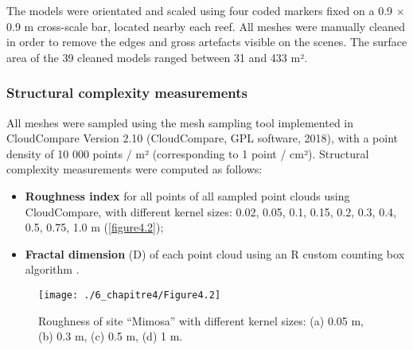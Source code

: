 The models were orientated and scaled using four coded markers fixed on a 0.9 $\times$ 0.9 m cross-scale bar, located nearby each reef. All meshes were manually cleaned in order to remove the edges and gross artefacts visible on the scenes. The surface area of the 39 cleaned models ranged between 31 and 433 m². 

\subsubsection{Structural complexity measurements}\label{chapitre4_2.1.2}
All meshes were sampled using the mesh sampling tool implemented in CloudCompare Version 2.10 (CloudCompare, GPL software, 2018), with a point density of 10 000 points / m² (corresponding to 1 point / cm²). Structural complexity measurements were computed as follows:

\begin{itemize}
    \item \textbf{Roughness index} for all points of all sampled point clouds using CloudCompare, with different kernel sizes: 0.02, 0.05, 0.1, 0.15, 0.2, 0.3, 0.4, 0.5, 0.75, 1.0 m (\autoref{figure4.2});
    
    \item \textbf{Fractal dimension} (D) of each point cloud using an R \citep{r_core_team_r_2020} custom counting box algorithm \citep{liebovitch_fast_1989}.
    
\end{itemize}

\begin{figure}[H]
	\begin{center}
	\texttt{[image: ./6\_chapitre4/Figure4.2]}
		\caption[Roughness of site “Mimosa” with different kernel sizes]{Roughness of site “Mimosa” with different kernel sizes: (a) 0.05 m, (b) 0.3 m, (c) 0.5 m, (d) 1 m.}
	\label{figure4.2}
\end{center}
\end{figure}

\newpage

